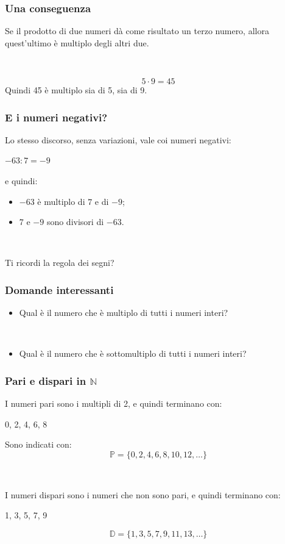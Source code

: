 \documentclass[]{beamer}
\theoremstyle{plain}
\begin{document}
\begin{frame}
\frametitle{Una conseguenza}
Se il prodotto di due numeri dà come risultato un terzo numero, allora quest'ultimo è multiplo degli altri due.\pause

~

\[5 \cdot 9 = 45 \]
Quindi 45 è multiplo sia di 5, sia di 9.
\end{frame}


\begin{frame}
\frametitle{E i numeri negativi?}
Lo stesso discorso, senza variazioni, vale coi numeri negativi:
\begin{center}
  $ -63 : 7 = -9 $
\end{center}\pause
e quindi:
\begin{itemize}
  \item $ -63 $ è multiplo di $ 7 $ e di $ -9 $;\pause
  \item $ 7 $ e $ -9 $ sono divisori di $ - 63 $.\pause
\end{itemize}

~

Ti ricordi la \alert{regola dei segni}?
\end{frame}


\begin{frame}
\frametitle{Domande interessanti}
\begin{itemize}
  \item Qual è il numero che è multiplo di tutti i numeri interi?\pause
  
  ~

  \item Qual è il numero che è sottomultiplo di tutti i numeri interi?
\end{itemize}
\end{frame}


\begin{frame}
\frametitle{Pari e dispari in $\mathbb{N}$}
I \alert{numeri pari} sono i multipli di 2, e quindi terminano con:
\begin{center}
  0, 2, 4, 6, 8
\end{center}\pause
Sono indicati con:
\[ \mathbb{P} = \{ 0, 2, 4, 6, 8, 10, 12, \ldots \} \]\pause

~

I \alert{numeri dispari} sono i numeri che non sono pari, e quindi terminano con:
\begin{center}
  1, 3, 5, 7, 9
\end{center}\pause
\[ \mathbb{D} = \{ 1, 3, 5, 7, 9, 11, 13, \ldots \} \]
\end{frame}
\end{document}
